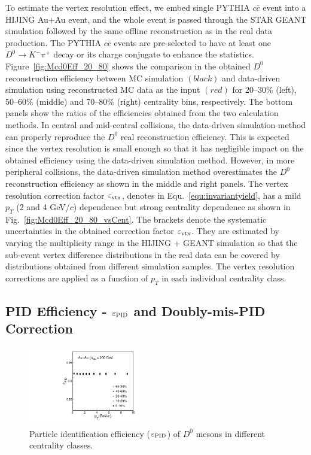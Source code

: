 \documentclass[%
 reprint,	
 amsmath,amssymb,
 aps,
 prc,
]{revtex4-1}
\begin{document}
To estimate the vertex resolution effect, we embed single PYTHIA $c\bar{c}$ event into a HIJING Au+Au event, and the whole event is passed through the STAR GEANT simulation followed by the same offline reconstruction as in the real data production. The PYTHIA $c\bar{c}$ events are pre-selected to have at least one $D^0\rightarrow K^-\pi^+$ decay or its charge conjugate to enhance the statistics. Figure~\ref{fig:Mcd0Eff_20_80} shows the comparison in the obtained $D^0$ reconstruction efficiency between MC simulation $(black)$ and data-driven simulation using reconstructed MC data as the input $(red)$ for 20--30\% (left), 50--60\% (middle) and 70--80\% (right) centrality bins, respectively. The bottom panels show the ratios of the efficiencies obtained from the two calculation methods. In central and mid-central collisions, the data-driven simulation method can properly reproduce the $D^0$ real reconstruction efficiency. This is expected since the vertex resolution is small enough so that it has negligible impact on the obtained efficiency using the data-driven simulation method. However, in more peripheral collisions, the data-driven simulation method overestimates the $D^0$ reconstruction efficiency as shown in the middle and right panels. The vertex resolution correction factor $\varepsilon_{\rm vtx}$, denotes in Equ.~\ref{equ:invariantyield}, has a mild $p_{T}$ (2 and 4 GeV/$c$) dependence but strong centrality dependence as shown in Fig.~\ref{fig:Mcd0Eff_20_80_vsCent}. The brackets denote the systematic uncertainties in the obtained correction factor $\varepsilon_{\rm vtx}$. They are estimated by varying the multiplicity range in the HIJING + GEANT simulation so that the sub-event vertex difference distributions in the real data can be covered by distributions obtained from different simulation samples. The vertex resolution corrections are applied as a function of $p_{T}$ in each individual centrality class.

\subsection{PID Efficiency - $\varepsilon_{\rm PID}$ and Doubly-mis-PID Correction}
\label{correction:PID}

\begin{figure}
\centering
\includegraphics[width=0.43\textwidth]{fig/Datad0Eff_pid_10.pdf}
\caption{Particle identification efficiency ($\varepsilon_{\rm PID}$) of $D^0$ mesons in different centrality classes.}
\label{fig:Datad0Eff_pid} 
\end{figure}
\end{document}
